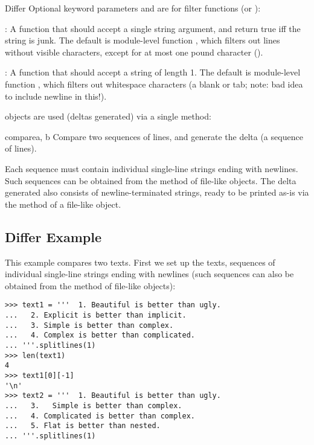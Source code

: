\begin{classdesc}{Differ}{}
  Optional keyword parameters  and  are
  for filter functions (or ):

  : A function that should accept a single string
  argument, and return true iff the string is junk. The default is
  module-level function , which filters out
  lines without visible characters, except for at most one pound
  character (\character{\#}).

  : A function that should accept a string of length 1.
  The default is module-level function ,
  which filters out whitespace characters (a blank or tab; note: bad
  idea to include newline in this!).
\end{classdesc}

 objects are used (deltas generated) via a single
method:

\begin{methoddesc}{compare}{a, b}
  Compare two sequences of lines, and generate the delta (a sequence
  of lines).

  Each sequence must contain individual single-line strings ending
  with newlines. Such sequences can be obtained from the
   method of file-like objects.  The delta generated
  also consists of newline-terminated strings, ready to be printed as-is
  via the  method of a file-like object.
\end{methoddesc}


\subsection{Differ Example \label{differ-examples}}

This example compares two texts. First we set up the texts, sequences
of individual single-line strings ending with newlines (such sequences
can also be obtained from the  method of file-like
objects):

\begin{verbatim}
>>> text1 = '''  1. Beautiful is better than ugly.
...   2. Explicit is better than implicit.
...   3. Simple is better than complex.
...   4. Complex is better than complicated.
... '''.splitlines(1)
>>> len(text1)
4
>>> text1[0][-1]
'\n'
>>> text2 = '''  1. Beautiful is better than ugly.
...   3.   Simple is better than complex.
...   4. Complicated is better than complex.
...   5. Flat is better than nested.
... '''.splitlines(1)
\end{verbatim}


